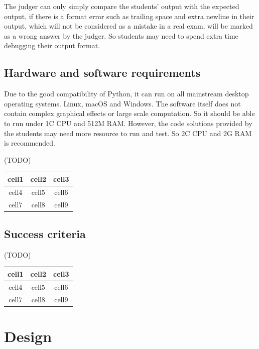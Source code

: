 \documentclass{report}
\begin{document}
The judger can only simply compare the students' output with the expected output, if there is a format error such as trailing space and extra newline in their output, which will not be considered as a mistake in a real exam, will be marked as a wrong answer by the judger. So students may need to spend extra time debugging their output format.

\section{Hardware and software requirements}

Due to the good compatibility of Python, it can run on all mainstream desktop operating systems. Linux, macOS and Windows. The software itself does not contain complex graphical effects or large scale computation. So it should be able to run under 1C CPU and 512M RAM. However, the code solutions provided by the students may need more resource to run and test. So 2C CPU and 2G RAM is recommended.

(TODO)

\begin{center}
    \begin{tabular}{ |c|c|c| }
        \hline
        cell1 & cell2 & cell3 \\
        \hline
        cell4 & cell5 & cell6 \\
        \hline
        cell7 & cell8 & cell9 \\
        \hline
    \end{tabular}
\end{center}

\section{Success criteria}

(TODO)

\begin{center}
    \begin{tabular}{ |c|c|c| }
        \hline
        cell1 & cell2 & cell3 \\
        \hline
        cell4 & cell5 & cell6 \\
        \hline
        cell7 & cell8 & cell9 \\
        \hline
    \end{tabular}
\end{center}


\chapter{Design}
\end{document}
